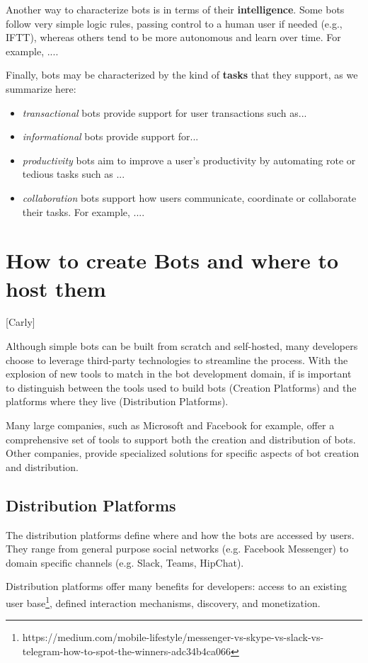 \documentclass{sig-alternate}
\begin{document}
Another way to characterize bots is in terms of their \textbf{intelligence}.  Some bots follow very simple logic rules, passing control to a human user if needed (e.g., IFTT), whereas others tend to be more autonomous and learn over time.  For example, ....

Finally, bots may be characterized by the kind of \textbf{tasks} that they support, as we summarize here: 
\begin{itemize}
\item \emph{transactional} bots provide support for user transactions such as...
\item \emph{informational} bots provide support for...
\item \emph{productivity} bots aim to improve a user's productivity by automating rote or tedious tasks such as ... 
\item \emph{collaboration} bots support how users communicate, coordinate or collaborate their tasks.  For example, ....
\end{itemize}
	
	

\section{How to create Bots and where to host them}
	[Carly]

	Although simple bots can be built from scratch and self-hosted, many developers choose to leverage third-party technologies to streamline the process. With the explosion of new tools to match in the bot development domain, if is important to distinguish between the tools used to build bots (Creation Platforms) and the platforms where they live (Distribution Platforms).

	Many large companies, such as Microsoft and Facebook for example, offer a comprehensive set of tools to support both the creation and distribution of bots. Other companies, provide specialized solutions for specific aspects of bot creation and distribution. 

	\subsection{Distribution Platforms}
	The distribution platforms define where and how the bots are accessed by users. They range from general purpose social networks (e.g. Facebook Messenger) to domain specific channels (e.g. Slack, Teams, HipChat).  

	Distribution platforms offer many benefits for developers: access to an existing user base\footnote{https://medium.com/mobile-lifestyle/messenger-vs-skype-vs-slack-vs-telegram-how-to-spot-the-winners-adc34b4ca066\label{How_to_spot_the_winners}}, defined interaction mechanisms, discovery, and monetization.  
\end{document}
